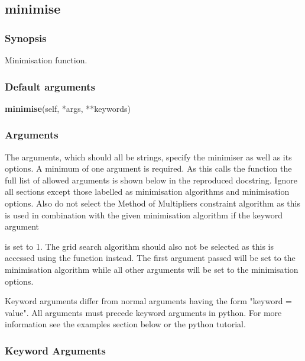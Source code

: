 



\newpage

\subsection{minimise}


\subsubsection{Synopsis}

Minimisation function.

\subsubsection{Default arguments}

\textsf{\textbf{minimise}(self, *args, **keywords)}


\subsubsection{Arguments}

The arguments, which should all be strings, specify the minimiser as well as its options.  A
minimum of one argument is required.  As this calls the function 
 the full
list of allowed arguments is shown below in the reproduced 
 docstring.
Ignore all sections except those labelled as minimisation algorithms and minimisation
options.  Also do not select the Method of Multipliers constraint algorithm as this is used
in combination with the given minimisation algorithm if the keyword argument 

is set to 1.  The grid search algorithm should also not be selected as this is accessed
using the 
 function instead.  The first argument passed will be set to the
minimisation algorithm while all other arguments will be set to the minimisation options.

Keyword arguments differ from normal arguments having the form "keyword = value".  All
arguments must precede keyword arguments in python.  For more information see the examples
section below or the python tutorial.


\subsubsection{Keyword Arguments}

